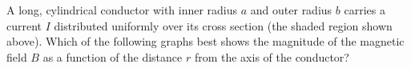\begin{questions}\setcounter{question}{0}\question
A long, cylindrical conductor with inner radius $a$ and outer radius $b$ carries a current $I$ distributed uniformly over its cross section (the shaded region shown above). Which of the following graphs best shows the magnitude of the magnetic field $B$ as a function of the distance $r$ from the axis of the conductor?

\begin{oneparchoices}
\choice {}
\choice {}
\choice {}

\end{oneparchoices}
\end{questions}

